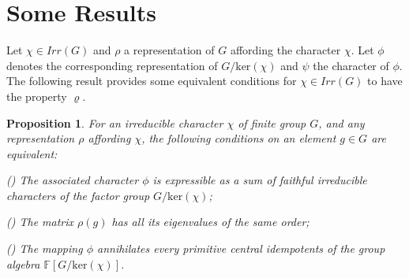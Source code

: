 \documentclass[12pt, reqno]{amsart}
\numberwithin{equation}{section}
\theoremstyle{definition}
\theoremstyle{remark}
\theoremstyle{plain}
\newtheorem{proposition}[definition]{Proposition}
\begin{document}
 \section{Some Results}
Let $\chi\in Irr(G)$ and $\rho$ a representation of $G$ affording the character $\chi$. Let $\phi$ denotes the corresponding representation of $G/\text{ker}(\chi)$ and $\psi$ the character of $\phi$. The following result provides some equivalent conditions for $\chi \in Irr(G)$ to have the property $\varrho$.
\begin{proposition}
For an irreducible character $\chi$ of finite group $G$, and any representation $\rho$ affording $\chi$, the following conditions on an element $g\in G$ are equivalent:\smallskip


 ()  The associated character $\phi$ is expressible as a sum of faithful irreducible characters of the factor group $G/\text{ker}(\chi)$;
 
 () The matrix $\rho(g)$ has all its eigenvalues of the same order;
 
 () The mapping $\phi$ annihilates every primitive central idempotents of the group algebra $\mathbb{F}[G/\text{ker}(\chi)]$.
\end{proposition} 
\end{document}
